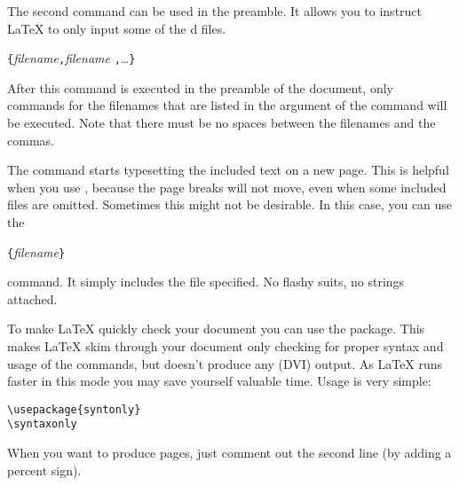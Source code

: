 The second command can be used in the preamble. It allows you to
instruct \LaTeX{} to only input some of the \verb||d files.
\begin{lscommand}
\verb|{|\emph{filename}\verb|,|\emph{filename}%
\verb|,|\ldots\verb|}|
\end{lscommand}
After this command is executed in the preamble of the document, only
 commands for the filenames that are listed in the
argument of the  command will be executed. Note that
there must be no spaces between the filenames and the commas.

The  command starts typesetting the included text on a new
page. This is helpful when you use , because the
page breaks will not move, even when some included files are omitted.
Sometimes this might not be desirable. In this case, you can use the
\begin{lscommand}
\verb|{|\emph{filename}\verb|}|
\end{lscommand}
\noindent command. It simply includes the file specified. 
No flashy suits, no strings attached.


To make \LaTeX{} quickly check your document you can use the 
package. This makes \LaTeX{} skim through your document only checking for
proper syntax and usage of the commands, but doesn't produce any (DVI) output.
As \LaTeX{} runs faster in this mode you may save yourself valuable time.
Usage is very simple:

\begin{verbatim}
\usepackage{syntonly}
\syntaxonly
\end{verbatim}
When you want to produce pages, just comment out the second line
(by adding a percent sign).


%


